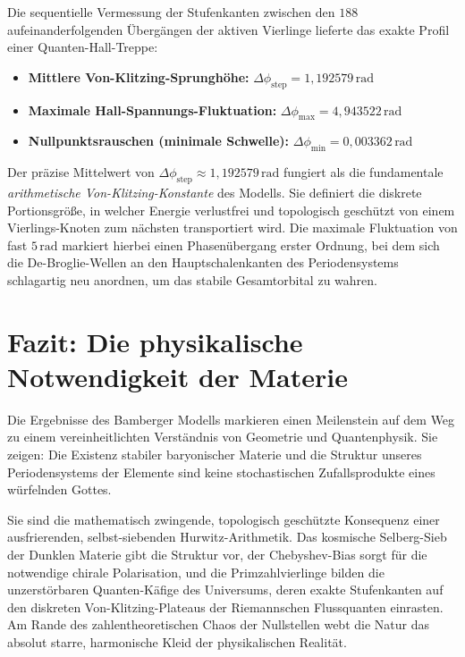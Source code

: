\documentclass[11pt,a4paper]{article}
\begin{document}
	Die sequentielle Vermessung der Stufenkanten zwischen den $188$ aufeinanderfolgenden Übergängen der aktiven Vierlinge lieferte das exakte Profil einer Quanten-Hall-Treppe:
	\begin{itemize}
		\item \textbf{Mittlere Von-Klitzing-Sprunghöhe:} $\Delta\phi_{\text{step}} = 1,192579\,\text{rad}$
		\item \textbf{Maximale Hall-Spannungs-Fluktuation:} $\Delta\phi_{\text{max}} = 4,943522\,\text{rad}$
		\item \textbf{Nullpunktsrauschen (minimale Schwelle):} $\Delta\phi_{\text{min}} = 0,003362\,\text{rad}$
	\end{itemize}
	Der präzise Mittelwert von $\Delta\phi_{\text{step}} \approx 1,192579\,\text{rad}$ fungiert als die fundamentale \textit{arithmetische Von-Klitzing-Konstante} des Modells. Sie definiert die diskrete Portionsgröße, in welcher Energie verlustfrei und topologisch geschützt von einem Vierlings-Knoten zum nächsten transportiert wird. Die maximale Fluktuation von fast $5\,\text{rad}$ markiert hierbei einen Phasenübergang erster Ordnung, bei dem sich die De-Broglie-Wellen an den Hauptschalenkanten des Periodensystems schlagartig neu anordnen, um das stabile Gesamtorbital zu wahren.
	
	\section{Fazit: Die physikalische Notwendigkeit der Materie}
	Die Ergebnisse des Bamberger Modells markieren einen Meilenstein auf dem Weg zu einem vereinheitlichten Verständnis von Geometrie und Quantenphysik. Sie zeigen: Die Existenz stabiler baryonischer Materie und die Struktur unseres Periodensystems der Elemente sind keine stochastischen Zufallsprodukte eines würfelnden Gottes.
	
	Sie sind die mathematisch zwingende, topologisch geschützte Konsequenz einer ausfrierenden, selbst-siebenden Hurwitz-Arithmetik. Das kosmische Selberg-Sieb der Dunklen Materie gibt die Struktur vor, der Chebyshev-Bias sorgt für die notwendige chirale Polarisation, und die Primzahlvierlinge bilden die unzerstörbaren Quanten-Käfige des Universums, deren exakte Stufenkanten auf den diskreten Von-Klitzing-Plateaus der Riemannschen Flussquanten einrasten. Am Rande des zahlentheoretischen Chaos der Nullstellen webt die Natur das absolut starre, harmonische Kleid der physikalischen Realität.
	
\end{document}

